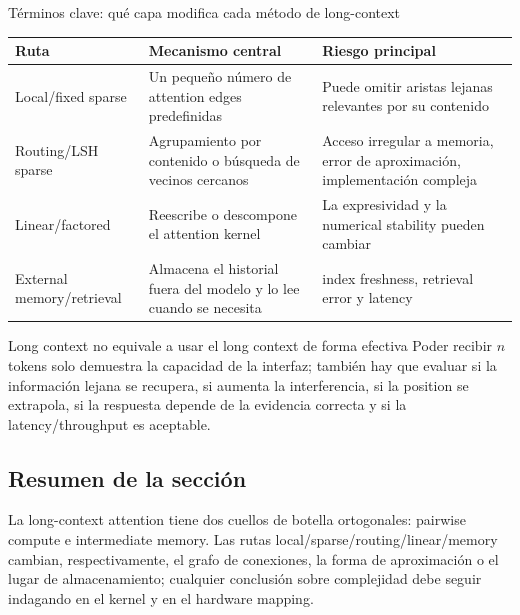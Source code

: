 \begin{knowledgebox}{Términos clave: qué capa modifica cada método de long-context}
\begin{tabularx}{\textwidth}{@{}L{0.22\textwidth}X X@{}}
\toprule
Ruta & Mecanismo central & Riesgo principal \\
\midrule
Local/fixed sparse & Un pequeño número de attention edges predefinidas & Puede omitir aristas lejanas relevantes por su contenido \\
Routing/LSH sparse & Agrupamiento por contenido o búsqueda de vecinos cercanos & Acceso irregular a memoria, error de aproximación, implementación compleja \\
Linear/factored & Reescribe o descompone el attention kernel & La expresividad y la numerical stability pueden cambiar \\
External memory/retrieval & Almacena el historial fuera del modelo y lo lee cuando se necesita & index freshness, retrieval error y latency \\
\bottomrule
\end{tabularx}
\end{knowledgebox}

\begin{importantbox}{Long context no equivale a usar el long context de forma efectiva}
Poder recibir $n$ tokens solo demuestra la capacidad de la interfaz; también hay que evaluar si la información lejana se recupera, si aumenta la interferencia, si la position se extrapola, si la respuesta depende de la evidencia correcta y si la latency/throughput es aceptable.
\end{importantbox}

\subsection{Resumen de la sección}

La long-context attention tiene dos cuellos de botella ortogonales: pairwise compute e intermediate memory. Las rutas local/sparse/routing/linear/memory cambian, respectivamente, el grafo de conexiones, la forma de aproximación o el lugar de almacenamiento; cualquier conclusión sobre complejidad debe seguir indagando en el kernel y en el hardware mapping.
